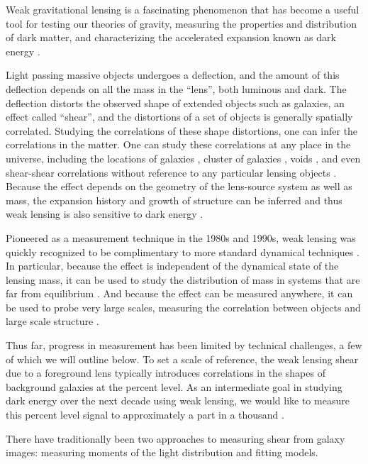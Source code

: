 \documentclass[iop]{emulateapj}
\begin{document}

Weak gravitational lensing is a fascinating phenomenon that has become a useful
tool for testing our theories of gravity, measuring the properties and
distribution of dark matter, and characterizing the accelerated expansion known
as dark energy \citep[for a review, see][]{HoekstraJain2008}.

Light passing massive objects undergoes a deflection, and the amount of this
deflection depends on all the mass in the ``lens'', both luminous and dark.
The deflection distorts the observed shape of extended objects such as
galaxies, an effect called ``shear'', and the distortions of a set of objects
is generally spatially correlated.  Studying the correlations of these shape
distortions, one can infer the correlations in the matter. One can study these
correlations at any place in the universe, including the locations of galaxies
\citep{Mandelbaum06}, cluster of galaxies \citep{JohnstonLensing07}, voids
\citep{MelchiorVoids2014}, and even shear-shear correlations without reference
to any particular lensing objects \citep{CFHTCosmicShear2013}.  Because the
effect depends on the geometry of the lens-source system as well as mass, the
expansion history and growth of structure can be inferred  and thus weak
lensing is also sensitive to dark energy \citep{HeymansTomography2013}.


Pioneered as a measurement technique in the 1980s and 1990s, weak lensing was
quickly recognized to be complimentary to more standard dynamical techniques
\citep{Tyson84}.  In particular, because the effect is independent of the
dynamical state of the lensing mass, it can be used to study the distribution
of mass in systems that are far from equilibrium \citep{CloweDMProof06}.   And
because the effect can be measured anywhere, it can be used to probe very large
scales, measuring the correlation between objects and large scale structure
 \citep{SheldonLensing09}.

Thus far, progress in measurement has been limited by technical challenges, a
few of which we will outline below.  To set a scale of reference, the weak
lensing shear due to a foreground lens typically introduces correlations in
the shapes of background galaxies at the percent level.    As an intermediate
goal in studying dark energy over the next decade using weak lensing, we would
like to measure this percent level signal to approximately a part in a
thousand \citep{HutererSystematics06}.

There have traditionally been two approaches to measuring shear from
galaxy images: measuring moments of the light distribution and fitting models.
\end{document}
